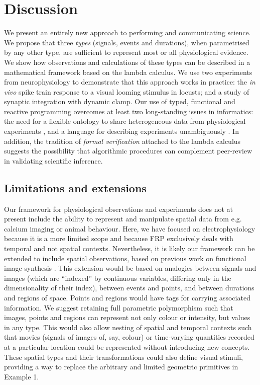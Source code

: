 \section*{Discussion}

We present an entirely new approach to performing and communicating
science. We propose that three \emph{types} (signals, events and
durations), when parametrised by any other type, are sufficient to
represent most or all physiological evidence. We show how observations
and calculations of these types can be described in a mathematical
framework based on the lambda calculus. We use two experiments from
neurophysiology to demonstrate that this approach works in practice:
the \emph{in vivo} spike train response to a visual looming stimulus
in locusts; and a study of synaptic integration with dynamic
clamp. Our use of typed, functional and reactive programming overcomes
at least two long-standing issues in informatics: the need for a
flexible ontology to share heterogeneous data from physiological
experiments \citep{Amari2002}, and a language for describing
experiments unambiguously \citep{Murray-Rust2002}. In addition, the
tradition of \emph{formal verification} attached to the lambda
calculus suggests the possibility that algorithmic procedures can
complement peer-review in validating scientific inference.

\subsection*{Limitations and extensions}

Our framework for physiological observations and experiments does not
at present include the ability to represent and manipulate spatial
data from e.g. calcium imaging or animal behaviour. Here, we have
focused on electrophysiology because it is a more limited scope and
because FRP exclusively deals with temporal and not spatial
contexts. Nevertheless, it is likely our framework can be extended to
include spatial observations, based on previous work on functional
image synthesis \citep{Elliott2003}. This extension would be based on
analogies between signals and images (which are ``indexed'' by
continuous variables, differing only in the dimensionality of their
index), between events and points, and between durations and regions
of space. Points and regions would have tags for carrying associated
information. We suggest retaining full parametric polymorphism such
that images, points and regions can represent not only colour or
intensity, but values in any type. This would also allow nesting of
spatial and temporal contexts such that movies (signals of images of,
say, colour) or time-varying quantities recorded at a particular
location \citep[for instance spot calcium measurements as points of
signals of concentration;][]{DiGregorio1999} could be represented
without introducing new concepts. These spatial types and their
transformations could also define visual stimuli, providing a way to
replace the arbitrary and limited geometric primitives in Example 1.

